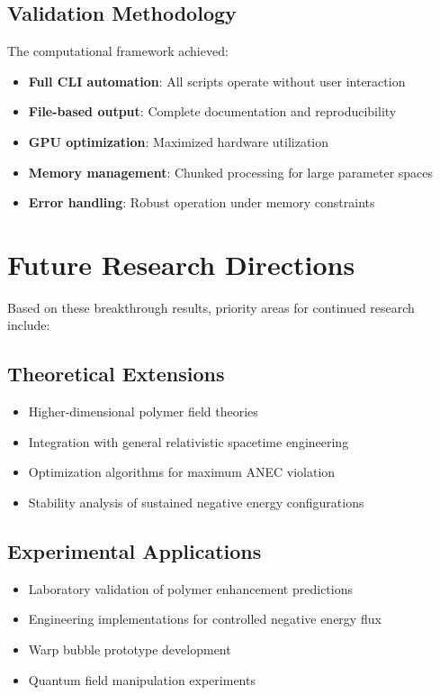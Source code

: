\documentclass[11pt]{article}
\begin{document}
\subsection{Validation Methodology}

The computational framework achieved:
\begin{itemize}
    \item \textbf{Full CLI automation}: All scripts operate without user interaction
    \item \textbf{File-based output}: Complete documentation and reproducibility
    \item \textbf{GPU optimization}: Maximized hardware utilization
    \item \textbf{Memory management}: Chunked processing for large parameter spaces
    \item \textbf{Error handling}: Robust operation under memory constraints
\end{itemize}

\section{Future Research Directions}

Based on these breakthrough results, priority areas for continued research include:

\subsection{Theoretical Extensions}
\begin{itemize}
    \item Higher-dimensional polymer field theories
    \item Integration with general relativistic spacetime engineering
    \item Optimization algorithms for maximum ANEC violation
    \item Stability analysis of sustained negative energy configurations
\end{itemize}

\subsection{Experimental Applications}
\begin{itemize}
    \item Laboratory validation of polymer enhancement predictions
    \item Engineering implementations for controlled negative energy flux
    \item Warp bubble prototype development
    \item Quantum field manipulation experiments
\end{itemize}
\end{document}
